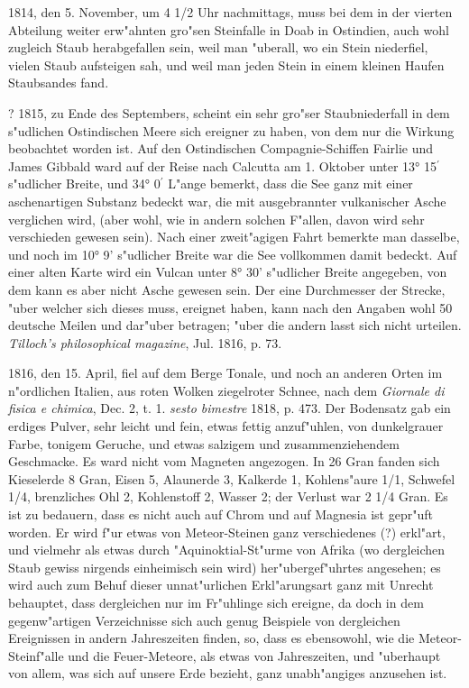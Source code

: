 \documentclass[a4paper, 11pt, oneside, polutonikogreek, german]{article}
\begin{document}
1814, den 5. November, um 4 1/2 Uhr nachmittags, muss bei dem in der vierten Abteilung weiter erw"ahnten gro"sen Steinfalle in Doab in Ostindien, auch wohl zugleich Staub herabgefallen sein, weil man "uberall, wo ein Stein niederfiel, vielen Staub aufsteigen sah, und weil man jeden Stein in einem kleinen Haufen Staubsandes fand.

? 1815, zu Ende des Septembers, scheint ein sehr gro"ser Staubniederfall in dem s"udlichen Ostindischen Meere sich ereigner zu haben, von dem nur die Wirkung beobachtet worden ist. Auf den Ostindischen Compagnie-Schiffen Fairlie und James Gibbald ward auf der Reise nach Calcutta am 1. Oktober unter 13° 15$^{\prime}$ s"udlicher Breite, und 34° 0$^{\prime}$ L"ange bemerkt, dass die See ganz mit einer aschenartigen Substanz bedeckt war, die mit ausgebrannter vulkanischer Asche verglichen wird, (aber wohl, wie in andern solchen F"allen, davon wird sehr verschieden gewesen sein). Nach einer zweit"agigen Fahrt bemerkte man dasselbe, und noch im 10° 9' s"udlicher Breite war die See vollkommen damit bedeckt. Auf einer alten Karte wird ein Vulcan unter 8° 30' s"udlicher Breite angegeben, von dem kann es aber nicht Asche gewesen sein. Der eine Durchmesser der Strecke, "uber welcher sich dieses muss, ereignet haben, kann nach den Angaben wohl 50 deutsche Meilen und dar"uber betragen; "uber die andern lasst sich nicht urteilen. \emph{Tilloch's philosophical magazine}, Jul. 1816, p. 73.

1816, den 15. April, fiel auf dem Berge Tonale, und noch an anderen Orten im n"ordlichen Italien, aus roten Wolken ziegelroter Schnee, nach dem \emph{Giornale di fisica e chimica}, Dec. 2, t. 1. \emph{sesto bimestre} 1818, p. 473. Der Bodensatz gab ein erdiges Pulver, sehr leicht und fein, etwas fettig anzuf"uhlen, von dunkelgrauer Farbe, tonigem Geruche, und etwas salzigem und zusammenziehendem Geschmacke. Es ward nicht vom Magneten angezogen. In 26 Gran fanden sich Kieselerde 8 Gran, Eisen 5, Alaunerde 3, Kalkerde 1, Kohlens"aure 1/1, Schwefel 1/4, brenzliches Ohl 2, Kohlenstoff 2, Wasser 2; der Verlust war 2 1/4 Gran. Es ist zu bedauern, dass es nicht auch auf Chrom und auf Magnesia ist gepr"uft worden. Er wird f"ur etwas von Meteor-Steinen ganz verschiedenes (?) erkl"art, und vielmehr als etwas durch "Aquinoktial-St"urme von Afrika (wo dergleichen Staub gewiss nirgends einheimisch sein wird) her"ubergef"uhrtes angesehen; es wird auch zum Behuf dieser unnat"urlichen Erkl"arungsart ganz mit Unrecht behauptet, dass dergleichen nur im Fr"uhlinge sich ereigne, da doch in dem gegenw"artigen Verzeichnisse sich auch genug Beispiele von dergleichen Ereignissen in andern Jahreszeiten finden, so, dass es ebensowohl, wie die Meteor-Steinf"alle und die Feuer-Meteore, als etwas von Jahreszeiten, und "uberhaupt von allem, was sich auf unsere Erde bezieht, ganz unabh"angiges anzusehen ist.
\end{document}

